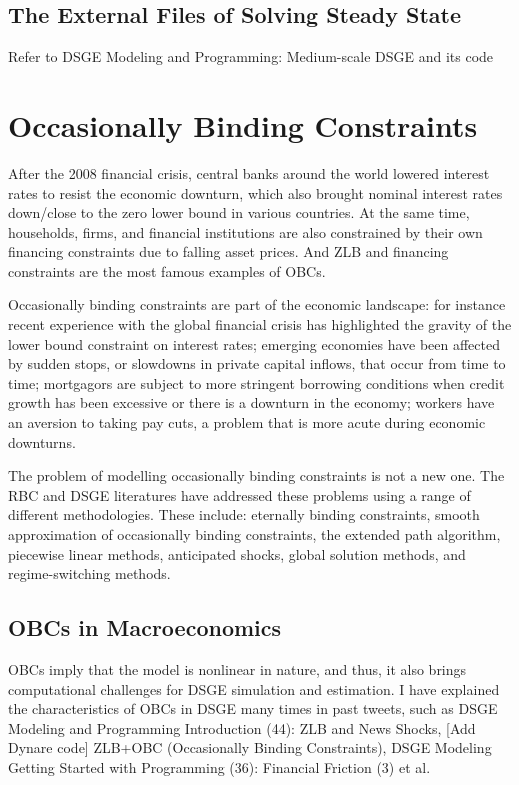 \documentclass[10pt,math=newtx,citestyle=gb7714-2015,bibstyle=gb7714-2015]{elegantbook}
\begin{document}
	
	\section{The External Files of Solving Steady State}
	
	Refer to DSGE Modeling and Programming: Medium-scale DSGE and its code
	
	
	\chapter{Occasionally Binding Constraints}
	
After the 2008 financial crisis, central banks around the world lowered interest rates to resist the economic downturn, which also brought nominal interest rates down/close to the zero lower bound in various countries. At the same time, households, firms, and financial institutions are also constrained by their own financing constraints due to falling asset prices. And ZLB and financing constraints are the most famous examples of OBCs.

Occasionally binding constraints are part of the economic landscape: for instance recent experience with the global financial crisis has highlighted the gravity of the lower bound constraint on interest rates; emerging economies have been affected by sudden stops, or slowdowns in private capital inflows, that occur from time to time; mortgagors are subject
to more stringent borrowing conditions when credit growth has been excessive or there is a downturn in the economy; workers have an aversion to taking pay cuts, a problem that is more acute during economic downturns.

The problem of modelling occasionally binding constraints is not a new one. The RBC and DSGE literatures have addressed these problems using a range of different methodologies. These include: eternally binding constraints, smooth approximation of occasionally binding constraints, the extended path algorithm, piecewise linear methods, anticipated shocks, global solution methods, and regime-switching methods.

\section{OBCs in Macroeconomics} \label{sec:modsetup}

OBCs imply that the model is nonlinear in nature, and thus, it also brings computational challenges for DSGE simulation and estimation. I have explained the characteristics of OBCs in DSGE many times in past tweets, such as DSGE Modeling and Programming Introduction (44): ZLB and News Shocks, [Add Dynare code] ZLB+OBC (Occasionally Binding Constraints), DSGE Modeling Getting Started with Programming (36): Financial Friction (3) et al.
\end{document}
